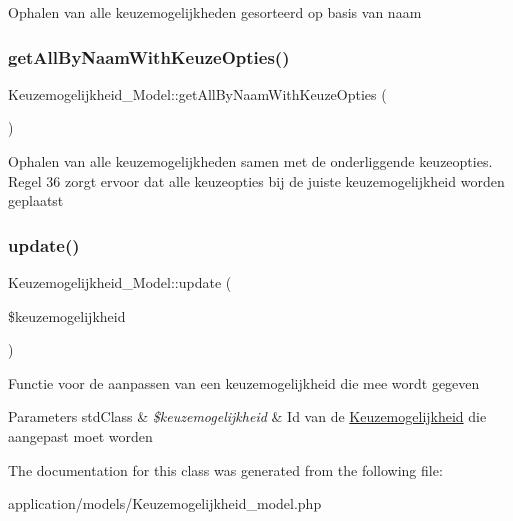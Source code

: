 Ophalen van alle keuzemogelijkheden gesorteerd op basis van naam \mbox{\label{class_keuzemogelijkheid___model_aa91aa36f90acdb972b5ba59935d1f499}} 
\subsubsection{\texorpdfstring{get\+All\+By\+Naam\+With\+Keuze\+Opties()}{getAllByNaamWithKeuzeOpties()}}
{\footnotesize\ttfamily Keuzemogelijkheid\+\_\+\+Model\+::get\+All\+By\+Naam\+With\+Keuze\+Opties (\begin{DoxyParamCaption}{ }\end{DoxyParamCaption})}

Ophalen van alle keuzemogelijkheden samen met de onderliggende keuzeopties. Regel 36 zorgt ervoor dat alle keuzeopties bij de juiste keuzemogelijkheid worden geplaatst \mbox{\label{class_keuzemogelijkheid___model_ab075f39b3a3ea0b4ee501c57ee9ca56c}} 
\subsubsection{\texorpdfstring{update()}{update()}}
{\footnotesize\ttfamily Keuzemogelijkheid\+\_\+\+Model\+::update (\begin{DoxyParamCaption}\item[{}]{\$keuzemogelijkheid }\end{DoxyParamCaption})}

Functie voor de aanpassen van een keuzemogelijkheid die mee wordt gegeven 
\begin{DoxyParams}[1]{Parameters}
std\+Class & {\em \$keuzemogelijkheid} & Id van de \mbox{\hyperlink{class_keuzemogelijkheid}{Keuzemogelijkheid}} die aangepast moet worden \\
\hline
\end{DoxyParams}


The documentation for this class was generated from the following file\+:\begin{DoxyCompactItemize}
\item 
application/models/Keuzemogelijkheid\+\_\+model.\+php\end{DoxyCompactItemize}

